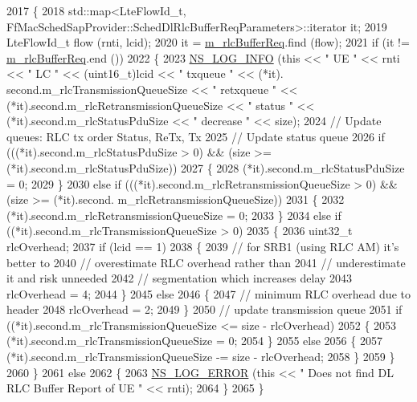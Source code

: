 \begin{DoxyCode}
2017 \{
2018   std::map<LteFlowId\_t, FfMacSchedSapProvider::SchedDlRlcBufferReqParameters>::iterator it;
2019   LteFlowId\_t flow (rnti, lcid);
2020   it = \hyperlink{classns3_1_1TdBetFfMacScheduler_a2c9685f472af05693a869d043fc1d35c}{m\_rlcBufferReq}.find (flow);
2021   \textcolor{keywordflow}{if} (it != \hyperlink{classns3_1_1TdBetFfMacScheduler_a2c9685f472af05693a869d043fc1d35c}{m\_rlcBufferReq}.end ())
2022     \{
2023       \hyperlink{group__logging_gafbd73ee2cf9f26b319f49086d8e860fb}{NS\_LOG\_INFO} (\textcolor{keyword}{this} << \textcolor{stringliteral}{" UE "} << rnti << \textcolor{stringliteral}{" LC "} << (uint16\_t)lcid << \textcolor{stringliteral}{" txqueue "} << (*it).
      second.m\_rlcTransmissionQueueSize << \textcolor{stringliteral}{" retxqueue "} << (*it).second.m\_rlcRetransmissionQueueSize << \textcolor{stringliteral}{" status "} 
      << (*it).second.m\_rlcStatusPduSize << \textcolor{stringliteral}{" decrease "} << size);
2024       \textcolor{comment}{// Update queues: RLC tx order Status, ReTx, Tx}
2025       \textcolor{comment}{// Update status queue}
2026       \textcolor{keywordflow}{if} (((*it).second.m\_rlcStatusPduSize > 0) && (size >= (*it).second.m\_rlcStatusPduSize))
2027         \{
2028            (*it).second.m\_rlcStatusPduSize = 0;
2029         \}
2030       \textcolor{keywordflow}{else} \textcolor{keywordflow}{if} (((*it).second.m\_rlcRetransmissionQueueSize > 0) && (size >= (*it).second.
      m\_rlcRetransmissionQueueSize))
2031         \{
2032           (*it).second.m\_rlcRetransmissionQueueSize = 0;
2033         \}
2034       \textcolor{keywordflow}{else} \textcolor{keywordflow}{if} ((*it).second.m\_rlcTransmissionQueueSize > 0)
2035         \{
2036           uint32\_t rlcOverhead;
2037           \textcolor{keywordflow}{if} (lcid == 1)
2038             \{
2039               \textcolor{comment}{// for SRB1 (using RLC AM) it's better to}
2040               \textcolor{comment}{// overestimate RLC overhead rather than}
2041               \textcolor{comment}{// underestimate it and risk unneeded}
2042               \textcolor{comment}{// segmentation which increases delay }
2043               rlcOverhead = 4;                                  
2044             \}
2045           \textcolor{keywordflow}{else}
2046             \{
2047               \textcolor{comment}{// minimum RLC overhead due to header}
2048               rlcOverhead = 2;
2049             \}
2050           \textcolor{comment}{// update transmission queue}
2051           \textcolor{keywordflow}{if} ((*it).second.m\_rlcTransmissionQueueSize <= size - rlcOverhead)
2052             \{
2053               (*it).second.m\_rlcTransmissionQueueSize = 0;
2054             \}
2055           \textcolor{keywordflow}{else}
2056             \{                    
2057               (*it).second.m\_rlcTransmissionQueueSize -= size - rlcOverhead;
2058             \}
2059         \}
2060     \}
2061   \textcolor{keywordflow}{else}
2062     \{
2063       \hyperlink{group__logging_ga0261a8db1d4ac5f79417d117634fd455}{NS\_LOG\_ERROR} (\textcolor{keyword}{this} << \textcolor{stringliteral}{" Does not find DL RLC Buffer Report of UE "} << rnti);
2064     \}
2065 \}
\end{DoxyCode}


